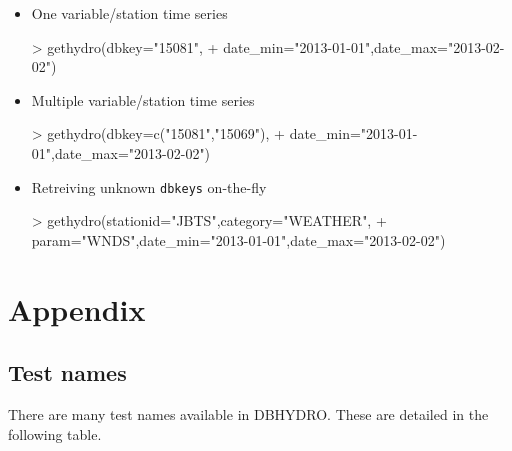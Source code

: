 \documentclass[12pt,notitlepage]{article}
\begin{document}
\begin{itemize}
\item One variable/station time series
\begin{Schunk}
\begin{Sinput}
> gethydro(dbkey="15081",
+          date_min="2013-01-01",date_max="2013-02-02")
\end{Sinput}
\end{Schunk}

\item Multiple variable/station time series
\begin{Schunk}
\begin{Sinput}
> gethydro(dbkey=c("15081","15069"),
+          date_min="2013-01-01",date_max="2013-02-02")
\end{Sinput}
\end{Schunk}

\item Retreiving unknown \texttt{dbkeys} on-the-fly

\begin{Schunk}
\begin{Sinput}
> gethydro(stationid="JBTS",category="WEATHER",
+          param="WNDS",date_min="2013-01-01",date_max="2013-02-02")
\end{Sinput}
\end{Schunk}

\end{itemize}

\section{\label{sec:appendix}Appendix}
\subsection{Test names}
There are many test names available in DBHYDRO. These are detailed in the following table.\\
\end{document}
